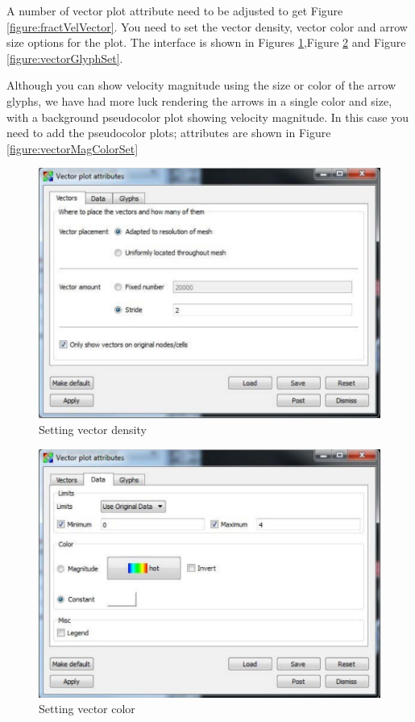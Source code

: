 \documentclass[12pt]{report}
\begin{document}
A number of vector plot attribute need to be adjusted to get Figure \ref{figure:fractVelVector}. 
You need to set the vector density, vector color and arrow size options for the plot. The interface is shown in Figures \ref{figure:vectorStrideSet},Figure \ref{figure:vectorColorSet} and Figure \ref{figure:vectorGlyphSet}. 

Although you can show velocity magnitude using the size or color of the arrow glyphs, we have had more luck
rendering the arrows in a single color and size, with a background pseudocolor plot showing velocity magnitude.
In this case you need to add the pseudocolor plots; attributes are shown in Figure \ref{figure:vectorMagColorSet}
	    
			  \begin{figure}
        \begin{center}
        \includegraphics{vectorStrideSet}
        \caption{Setting vector density }
        \label{figure:vectorStrideSet}
        \end{center}
        \end{figure} 
				
				\begin{figure}
        \begin{center}
        \includegraphics{vectorColorSet}
        \caption{Setting vector color }
        \label{figure:vectorColorSet}
        \end{center}
        \end{figure} 
				
\end{document}
